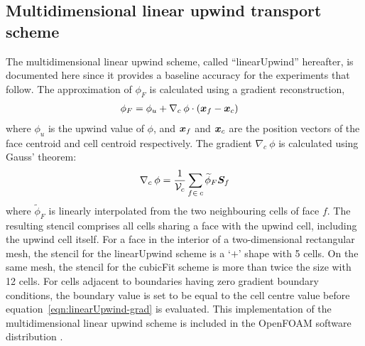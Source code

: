 \subsection{Multidimensional linear upwind transport scheme}

The multidimensional linear upwind scheme, called ``linearUpwind'' hereafter, is documented here since it provides a baseline accuracy for the experiments that follow.  The approximation of $\phi_F$ is calculated using a gradient reconstruction,
\begin{align}
	\phi_F &= \phi_u + \nabla_c\: \phi \cdot \left(\bm{x}_f - \bm{x}_c \right)
\end{align} 
where $\phi_u$ is the upwind value of $\phi$, and $\bm{x}_f$ and $\bm{x}_c$ are the position vectors of the face centroid and cell centroid respectively.
The gradient $\nabla_c \:\phi$ is calculated using Gauss' theorem:
\begin{align}
	\nabla_c\: \phi = \frac{1}{\mathcal{V}_c} \sum_{f\in\:c} \widetilde{\phi}_F \bm{S}_f \label{eqn:linearUpwind-grad}
\end{align}
where $\widetilde{\phi}_F$ is linearly interpolated from the two neighbouring cells of face $f$.
The resulting stencil comprises all cells sharing a face with the upwind cell, including the upwind cell itself.  For a face in the interior of a two-dimensional rectangular mesh, the stencil for the linearUpwind scheme is a `$+$' shape with 5 cells.  On the same mesh, the stencil for the cubicFit scheme is more than twice the size with 12 cells.
For cells adjacent to boundaries having zero gradient boundary conditions, the boundary value is set to be equal to the cell centre value before equation~\eqref{eqn:linearUpwind-grad} is evaluated.
This implementation of the multidimensional linear upwind scheme is included in the OpenFOAM software distribution \citep{openfoam-numerics}.
